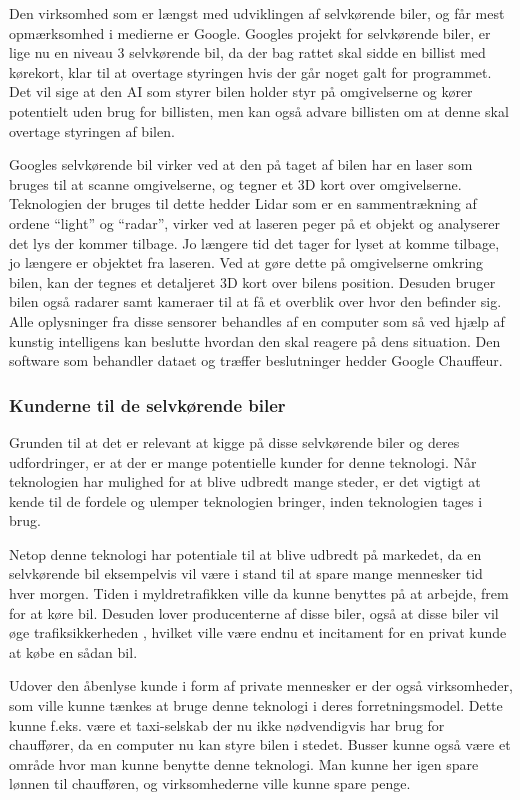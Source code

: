 Den virksomhed som er længst med udviklingen af selvkørende biler, og får mest opmærksomhed i medierne er Google. Googles projekt for selvkørende biler, er lige nu en niveau 3 selvkørende bil, da der bag rattet skal sidde en billist med kørekort, klar til at overtage styringen hvis der går noget galt for programmet. Det vil sige at den AI som styrer bilen holder styr på omgivelserne og kører potentielt uden brug for billisten, men kan også advare billisten om at denne skal overtage styringen af bilen.

Googles selvkørende bil virker ved at den på taget af bilen har en laser som bruges til at scanne omgivelserne, og tegner et 3D kort over omgivelserne. Teknologien der bruges til dette hedder Lidar som er en sammentrækning af ordene ``light'' og ``radar'', virker ved at laseren peger på et objekt og analyserer det lys der kommer tilbage. Jo længere tid det tager for lyset at komme tilbage, jo længere er objektet fra laseren. Ved at gøre dette på omgivelserne omkring bilen, kan der tegnes et detaljeret 3D kort over bilens position. Desuden bruger bilen også radarer samt kameraer til at få et overblik over hvor den befinder sig. Alle oplysninger fra disse sensorer behandles af en computer som så ved hjælp af kunstig intelligens kan beslutte hvordan den skal reagere på dens situation. Den software som behandler dataet og træffer beslutninger hedder Google Chauffeur.

\subsubsection{Kunderne til de selvkørende biler}
Grunden til at det er relevant at kigge på disse selvkørende biler og deres udfordringer, er at der er mange potentielle kunder for denne teknologi. Når teknologien har mulighed for at blive udbredt mange steder, er det vigtigt at kende til de fordele og ulemper teknologien bringer, inden teknologien tages i brug.

Netop denne teknologi har potentiale til at blive udbredt på markedet, da en selvkørende bil eksempelvis vil være i stand til at spare mange mennesker tid hver morgen. Tiden i myldretrafikken ville da kunne benyttes på at arbejde, frem for at køre bil. Desuden lover producenterne af disse biler, også at disse biler vil øge trafiksikkerheden \cite{GOOG_SITE}, hvilket ville være endnu et incitament for en privat kunde at købe en sådan bil.

Udover den åbenlyse kunde i form af private mennesker er der også virksomheder, som ville kunne tænkes at bruge denne teknologi i deres forretningsmodel. Dette kunne f.eks. være et taxi-selskab der nu ikke nødvendigvis har brug for chauffører, da en computer nu kan styre bilen i stedet. Busser kunne også være et område hvor man kunne benytte denne teknologi. Man kunne her igen spare lønnen til chaufføren, og virksomhederne ville kunne spare penge.

